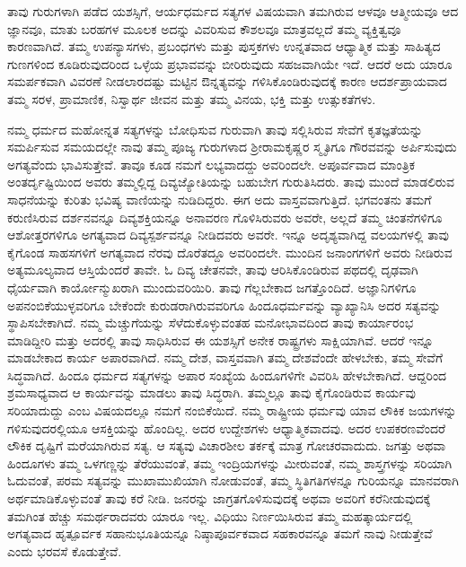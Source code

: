 \vskip 0.2cm

ತಾವು ಗುರುಗಳಾಗಿ ಪಡೆದ ಯಶಸ್ಸಿಗೆ, ಆರ್ಯಧರ್ಮದ ಸತ್ಯಗಳ ವಿಷಯವಾಗಿ ತಮಗಿರುವ ಆಳವೂ ಆತ್ಮೀಯವೂ ಆದ ಜ್ಞಾನವೂ, ಮಾತು ಬರಹಗಳ ಮೂಲಕ ಅದನ್ನು ವಿವರಿಸುವ ಕೌಶಲವೂ ಮಾತ್ರವಲ್ಲದೆ ತಮ್ಮ ವ್ಯಕ್ತಿತ್ವವೂ ಕಾರಣವಾಗಿದೆ. ತಮ್ಮ ಉಪನ್ಯಾಸಗಳು, ಪ್ರಬಂಧಗಳು ಮತ್ತು ಪುಸ್ತಕಗಳು ಉನ್ನತವಾದ ಆಧ್ಯಾತ್ಮಿಕ ಮತ್ತು ಸಾಹಿತ್ಯದ ಗುಣಗಳಿಂದ ಕೂಡಿರುವುದರಿಂದ ಒಳ್ಳೆಯ ಪ್ರಭಾವವನ್ನು ಬೀರಿರುವುದು ಸಹಜವಾಗಿಯೇ ಇದೆ. ಆದರೆ ಅದು ಯಾರೂ ಸಮರ್ಪಕವಾಗಿ ವಿವರಣೆ ನೀಡಲಾರದಷ್ಟು ಮಟ್ಟಿನ ಔನ್ನತ್ಯವನ್ನು ಗಳಿಸಿಕೊಂಡಿರುವುದಕ್ಕೆ ಕಾರಣ ಆದರ್ಶಪ್ರಾಯವಾದ ತಮ್ಮ ಸರಳ, ಪ್ರಾಮಾಣಿಕ, ನಿಸ್ವಾರ್ಥ ಜೀವನ ಮತ್ತು ತಮ್ಮ ವಿನಯ, ಭಕ್ತಿ ಮತ್ತು ಉತ್ಸುಕತೆಗಳು.

\vskip 0.2cm

ನಮ್ಮ ಧರ್ಮದ ಮಹೋನ್ನತ ಸತ್ಯಗಳನ್ನು ಬೋಧಿಸುವ ಗುರುವಾಗಿ ತಾವು ಸಲ್ಲಿಸಿರುವ ಸೇವೆಗೆ ಕೃತಜ್ಞತೆಯನ್ನು ಸಮರ್ಪಿಸುವ ಸಮಯದಲ್ಲೇ ನಾವು ತಮ್ಮ ಪೂಜ್ಯ ಗುರುಗಳಾದ ಶ‍್ರೀರಾಮಕೃಷ್ಣರ ಸ್ಮೃತಿಗೂ ಗೌರವವನ್ನು ಅರ್ಪಿಸುವುದು ಅಗತ್ಯವೆಂದು ಭಾವಿಸುತ್ತೇವೆ. ತಾವೂ ಕೂಡ ನಮಗೆ ಲಭ್ಯವಾದದ್ದು ಅವರಿಂದಲೇ. ಅಪೂರ್ವವಾದ ಮಾಂತ್ರಿಕ ಅಂತರ್ದೃಷ್ಟಿಯಿಂದ ಅವರು ತಮ್ಮಲ್ಲಿದ್ದ ದಿವ್ಯಜ್ಯೋತಿಯನ್ನು ಬಹುಬೇಗ ಗುರುತಿಸಿದರು. ತಾವು ಮುಂದೆ ಮಾಡಲಿರುವ ಸಾಧನೆಯನ್ನು ಕುರಿತು ಭವಿಷ್ಯ ವಾಣಿಯನ್ನು ನುಡಿದಿದ್ದರು. ಈಗ ಅದು ವಾಸ್ತವವಾಗುತ್ತಿದೆ. ಭಗವಂತನು ತಮಗೆ ಕರುಣಿಸಿರುವ ದರ್ಶನವನ್ನೂ ದಿವ್ಯಶಕ್ತಿಯನ್ನೂ ಅನಾವರಣ ಗೊಳಿಸಿರುವರು ಅವರೇ, ಅಲ್ಲದೆ ತಮ್ಮ ಚಿಂತನೆಗಳಿಗೂ ಆಶೋತ್ತರಗಳಿಗೂ ಅಗತ್ಯವಾದ ದಿವ್ಯಸ್ಪರ್ಶವನ್ನೂ ನೀಡಿದವರು ಅವರೇ. ಇನ್ನೂ ಅದೃಶ್ಯವಾಗಿದ್ದ ವಲಯಗಳಲ್ಲಿ ತಾವು ಕೈಗೊಂಡ ಸಾಹಸಗಳಿಗೆ ಅಗತ್ಯವಾದ ನೆರವು ದೊರೆತದ್ದೂ ಅವರಿಂದಲೇ. ಮುಂದಿನ ಜನಾಂಗಗಳಿಗೆ ಅವರು ನೀಡಿರುವ ಅತ್ಯಮೂಲ್ಯವಾದ ಆಸ್ತಿಯೆಂದರೆ ತಾವೇ. ಓ ದಿವ್ಯ ಚೇತನವೇ, ತಾವು ಆರಿಸಿಕೊಂಡಿರುವ ಪಥದಲ್ಲಿ ದೃಢವಾಗಿ ಧೈರ್ಯವಾಗಿ ಕಾರ್ಯೋನ್ಮುಖರಾಗಿ ಮುಂದುವರಿಯಿರಿ. ತಾವು ಗೆಲ್ಲಬೇಕಾದ ಜಗತ್ತೊಂದಿದೆ. ಅಜ್ಞಾನಿಗಳಿಗೂ ಅಪನಂಬಿಕೆಯುಳ್ಳವರಿಗೂ ಬೇಕೆಂದೇ ಕುರುಡರಾಗಿರುವವರಿಗೂ ಹಿಂದೂಧರ್ಮವನ್ನು ವ್ಯಾಖ್ಯಾನಿಸಿ ಅದರ ಸತ್ಯವನ್ನು ಸ್ಥಾಪಿಸಬೇಕಾಗಿದೆ. ನಮ್ಮ ಮೆಚ್ಚುಗೆಯನ್ನು ಸೆಳೆದುಕೊಳ್ಳುವಂತಹ ಮನೋಭಾವದಿಂದ ತಾವು ಕಾರ್ಯಾರಂಭ ಮಾಡಿದ್ದೀರಿ ಮತ್ತು ಅದರಲ್ಲಿ ತಾವು ಸಾಧಿಸಿರುವ ಈ ಯಶಸ್ಸಿಗೆ ಅನೇಕ ರಾಷ್ಟ್ರಗಳು ಸಾಕ್ಷಿಯಾಗಿವೆ. ಆದರೆ ಇನ್ನೂ ಮಾಡಬೇಕಾದ ಕಾರ್ಯ ಅಪಾರವಾಗಿದೆ. ನಮ್ಮ ದೇಶ, ವಾಸ್ತವವಾಗಿ ತಮ್ಮ ದೇಶವೆಂದೇ ಹೇಳಬೇಕು, ತಮ್ಮ ಸೇವೆಗೆ ಸಿದ್ಧವಾಗಿದೆ. ಹಿಂದೂ ಧರ್ಮದ ಸತ್ಯಗಳನ್ನು ಅಪಾರ ಸಂಖ್ಯೆಯ ಹಿಂದೂಗಳಿಗೇ ವಿವರಿಸಿ ಹೇಳಬೇಕಾಗಿದೆ. ಆದ್ದರಿಂದ ಶ್ರಮಸಾಧ್ಯವಾದ ಆ ಕಾರ್ಯವನ್ನು ಮಾಡಲು ತಾವು ಸಿದ್ಧರಾಗಿ. ತಮ್ಮಲ್ಲೂ ತಾವು ಕೈಗೊಂಡಿರುವ ಕಾರ್ಯವು ಸರಿಯಾದುದ್ದು ಎಂಬ ವಿಷಯದಲ್ಲೂ ನಮಗೆ ನಂಬಿಕೆಯಿದೆ. ನಮ್ಮ ರಾಷ್ಟ್ರೀಯ ಧರ್ಮವು ಯಾವ ಲೌಕಿಕ ಜಯಗಳನ್ನು ಗಳಿಸುವುದರಲ್ಲಿಯೂ ಆಸಕ್ತಿಯನ್ನು ಹೊಂದಿಲ್ಲ. ಅದರ ಉದ್ದೇಶಗಳು ಆಧ್ಯಾತ್ಮಿಕವಾದವು. ಅದರ ಉಪಕರಣವೆಂದರೆ ಲೌಕಿಕ ದೃಷ್ಟಿಗೆ ಮರೆಯಾಗಿರುವ ಸತ್ಯ. ಆ ಸತ್ಯವು ವಿಚಾರಶೀಲ ತರ್ಕಕ್ಕೆ ಮಾತ್ರ ಗೋಚರವಾದುದು. ಜಗತ್ತು ಅಥವಾ ಹಿಂದೂಗಳು ತಮ್ಮ ಒಳಗಣ್ಣನ್ನು ತೆರೆಯುವಂತೆ, ತಮ್ಮ ಇಂದ್ರಿಯಗಳನ್ನು ಮೀರುವಂತೆ, ನಮ್ಮ ಶಾಸ್ತ್ರಗಳನ್ನು ಸರಿಯಾಗಿ ಓದುವಂತೆ, ಪರಮ ಸತ್ಯವನ್ನು ಮುಖಾಮುಖಿಯಾಗಿ ನೋಡುವಂತೆ, ತಮ್ಮ ಸ್ಥಿತಿಗತಿಗಳನ್ನೂ ಗುರಿಯನ್ನೂ ಮಾನವರಾಗಿ ಅರ್ಥಮಾಡಿಕೊಳ್ಳುವಂತೆ ತಾವು ಕರೆ ನೀಡಿ. ಜನರನ್ನು ಜಾಗ್ರತಗೊಳಿಸುವುದಕ್ಕೆ ಅಥವಾ ಅವರಿಗೆ ಕರೆನೀಡುವುದಕ್ಕೆ ತಮಗಿಂತ ಹೆಚ್ಚು ಸಮರ್ಥರಾದವರು ಯಾರೂ ಇಲ್ಲ. ವಿಧಿಯು ನಿರ್ಣಯಿಸಿರುವ ತಮ್ಮ ಮಹತ್ಕಾರ್ಯದಲ್ಲಿ ಅಗತ್ಯವಾದ ಹೃತ್ಪೂರ್ವಕ ಸಹಾನುಭೂತಿಯನ್ನೂ ನಿಷ್ಠಾಪೂರ್ವಕವಾದ ಸಹಕಾರವನ್ನೂ ತಮಗೆ ನಾವು ನೀಡುತ್ತೇವೆ ಎಂದು ಭರವಸೆ ಕೊಡುತ್ತೇವೆ.

